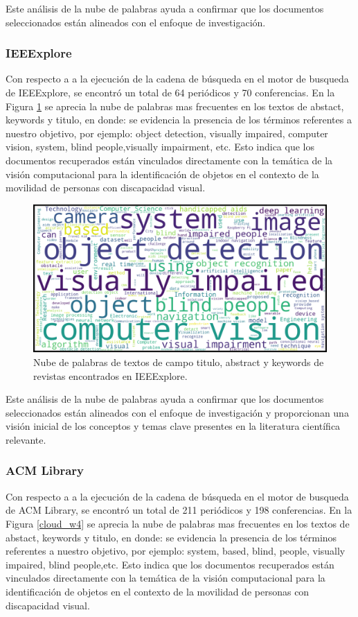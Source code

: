 \documentclass[letterpaper]{article}
\begin{document}
Este análisis de la nube de palabras ayuda a confirmar que los documentos seleccionados están alineados con el enfoque de investigación.

\subsubsection{IEEExplore}
    Con respecto a a la ejecución de la cadena de búsqueda en el motor de busqueda de IEEExplore, se encontró un total de 64 periódicos y 70 conferencias.
En la Figura \ref{cloud_w3} se aprecia la nube de palabras mas frecuentes en los textos de abstact, keywords y titulo, en donde: se evidencia la presencia de los términos referentes a nuestro objetivo, por ejemplo: object detection, visually impaired, computer vision, system, blind people,visually impairment, etc. 
Esto indica que los documentos recuperados están vinculados directamente con la temática de la visión computacional para la identificación de objetos en el contexto de la movilidad de personas con discapacidad visual.

    	\begin{figure}[H]
    		\centering
    		\includegraphics[width=1\columnwidth]{graficos/IEEE-nube.png}
    		\caption{Nube de palabras de textos de campo titulo, abstract y keywords de revistas encontrados en IEEExplore.}
    		\label{cloud_w3}
    	\end{figure}

Este análisis de la nube de palabras ayuda a confirmar que los documentos seleccionados están alineados con el enfoque de investigación y proporcionan una visión inicial de los conceptos y temas clave presentes en la literatura científica relevante.

\subsubsection{ACM Library}
    Con respecto a a la ejecución de la cadena de búsqueda en el motor de busqueda de ACM Library, se encontró un total de 211 periódicos y 198 conferencias.
En la Figura \ref{cloud_w4} se aprecia la nube de palabras mas frecuentes en los textos de abstact, keywords y titulo, en donde: se evidencia la presencia de los términos referentes a nuestro objetivo, por ejemplo: system, based, blind, people, visually impaired, blind people,etc. 
Esto indica que los documentos recuperados están vinculados directamente con la temática de la visión computacional para la identificación de objetos en el contexto de la movilidad de personas con discapacidad visual.
\end{document}
